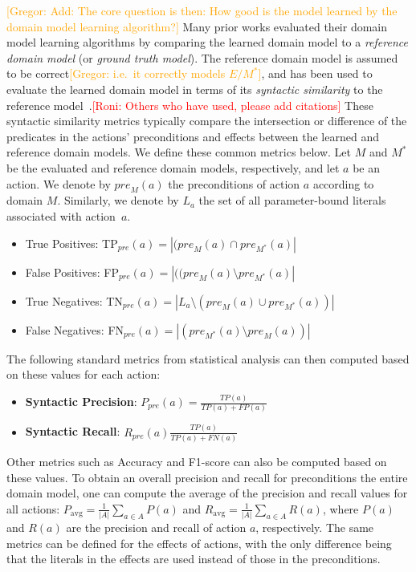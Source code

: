 \documentclass{article}
\theoremstyle{definition}
\theoremstyle{remark}
\newcommand{\realm}{\ensuremath{M^*}\xspace}
\newcommand{\pre}{\ensuremath{\textit{pre}}\xspace}
\newcommand{\eff}{\ensuremath{\textit{eff}}\xspace}
\newcommand{\roni}[1]{{\textcolor{red}{[Roni: #1]}}}
\newcommand{\gregor}[1]{{\textcolor{orange}{[Gregor: #1]}}}
\begin{document}
\gregor{Add: The core question is then: How good is the model learned by the domain model learning algorithm?}
Many prior works evaluated their domain model learning algorithms by comparing the learned domain model to a \emph{reference domain model} (or \emph{ground truth model}). 
The reference domain model is assumed to be correct\gregor{i.e.\ it correctly models $E/\realm$}, and has been used to evaluate the learned domain model in terms of its \emph{syntactic similarity} to the reference model~\citep{aineto2019learning,mordoch2023safe,xi2024neuro,Oswald2024DLLMDomainModeling}.\roni{Others who have used, please add citations}
These syntactic similarity metrics typically compare the intersection or difference of the predicates in the actions' preconditions and effects between the learned and reference domain models. We define these common metrics below. 
Let $M$ and $\realm$ be the evaluated and reference domain models, respectively, and let $a$ be an action. We denote by $\pre_M(a)$ the preconditions of action $a$ according to domain $M$.
Similarly, we denote by $L_a$ the set of all parameter-bound literals associated with action~$a$.


 \begin{itemize}
    \item True Positives: TP$_\pre(a)=|(\pre_M(a)\cap \pre_\realm(a)|$
    \item False Positives: FP$_\pre(a)=|((\pre_M(a)\setminus \pre_\realm(a)|$
    \item True Negatives: TN$_\pre(a)=|L_a \setminus(\pre_M(a)\cup \pre_\realm(a))|$
    \item False Negatives: FN$_\pre(a)=|(\pre_\realm(a)\setminus \pre_M(a))|$
\end{itemize}
The following standard metrics from statistical analysis can then computed based on these values for each action:
\begin{itemize}
    \item \textbf{Syntactic Precision}: $P_\pre(a)=\frac{TP(a)}{TP(a)+FP(a)}$
    \item \textbf{Syntactic Recall}: $R_\pre(a)\frac{TP(a)}{TP(a)+FN(a)}$
\end{itemize}
Other metrics such as Accuracy and F1-score can also be computed based on these values. 
To obtain an overall precision and recall for preconditions the entire domain model, one can compute the average of the precision and recall values for all actions:
$P_\text{avg}=\frac{1}{|A|}\sum_{a\in A} P(a)$ and $R_\text{avg}=\frac{1}{|A|}\sum_{a\in A} R(a)$, where $P(a)$ and $R(a)$ are the precision and recall of action $a$, respectively. 
The same metrics can be defined for the effects of actions, with the only difference being that the literals in the effects are used instead of those in the preconditions. 
\end{document}
